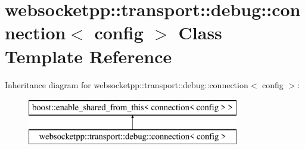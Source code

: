 \hypertarget{classwebsocketpp_1_1transport_1_1debug_1_1connection}{}\section{websocketpp\+:\+:transport\+:\+:debug\+:\+:connection$<$ config $>$ Class Template Reference}
\label{classwebsocketpp_1_1transport_1_1debug_1_1connection}
Inheritance diagram for websocketpp\+:\+:transport\+:\+:debug\+:\+:connection$<$ config $>$\+:\begin{figure}[H]
\begin{center}
\leavevmode
\includegraphics[height=2.000000cm]{classwebsocketpp_1_1transport_1_1debug_1_1connection}
\end{center}
\end{figure}
